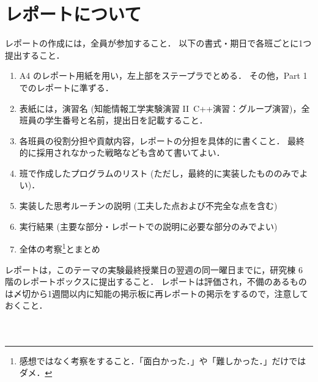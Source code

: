 \section{レポートについて}
レポートの作成には，全員が参加すること．
以下の書式・期日で各班ごとに1つ提出すること．
\begin{enumerate}
 \item A4 のレポート用紙を用い，左上部をステープラでとめる．
その他，Part 1 でのレポートに準ずる．
 \item 表紙には，演習名 (知能情報工学実験演習 II\ C++演習：グループ演習)，全班員の学生番号と名前，提出日を記載すること．
 \item 各班員の役割分担や貢献内容，レポートの分担を具体的に書くこと．
最終的に採用されなかった戦略なども含めて書いてよい．
 \item 班で作成したプログラムのリスト (ただし，最終的に実装したもののみでよい)．
 \item 実装した思考ルーチンの説明 (工夫した点および不完全な点を含む)
 \item 実行結果 (主要な部分・レポートでの説明に必要な部分のみでよい)
 \item 全体の考察\footnote{感想ではなく考察をすること．「面白かった．」や「難しかった．」だけではダメ．}とまとめ
 \end{enumerate}
レポートは，このテーマの実験最終授業日の翌週の同一曜日までに，研究棟 6 階のレポートボックスに提出すること．
レポートは評価され，不備のあるものは〆切から1週間以内に知能の掲示板に再レポートの掲示をするので，注意しておくこと．



\begin{quote}
\begin{verbatim}

\end{verbatim}
\end{quote}

\begin{quote}
\begin{verbatim}

\end{verbatim}
\end{quote}

\begin{quote}
\begin{verbatim}

\end{verbatim}
\end{quote}




